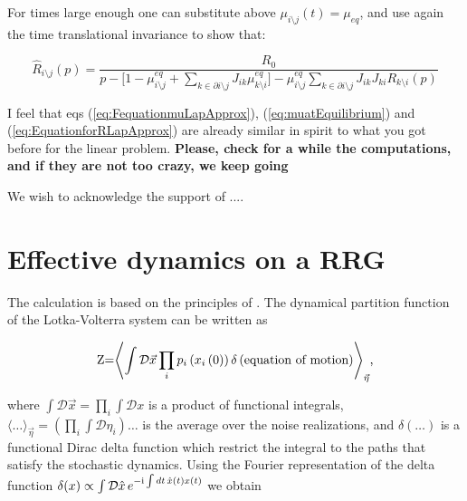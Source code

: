 \documentclass[
    preprint,
    linenumbers,
    amsmath,amssymb,amsfonts,
    aps, physrev,
    superscriptaddress,
    10pt,
    bibnotes
    ]{revtex4-2}
\begin{document}
For times large enough one can substitute above $\mu_{i \setminus j}(t)=\mu_{eq}$, and use again the time translational invariance to show that:

\begin{equation}
  \hat{R}_{i\setminus j}(p) = \frac{R_0}{ p -  \Big[1 - \mu^{eq}_{i \setminus j} + \sum_{k\in\partial i\setminus j}J_{ik}\mu^{eq}_{k\setminus i} \Big] -  \mu^{eq}_{i \setminus j}  \sum_{k\in\partial i\setminus j}
    J_{ik}J_{ki} R_{k\setminus i}(p)}
  \label{eq:EquationforRLapApprox}
\end{equation}


I feel that eqs (\ref{eq:FequationmuLapApprox}), (\ref{eq:muatEquilibrium}) and
(\ref{eq:EquationforRLapApprox}) are already similar in spirit to what you got before for the linear problem. {\bf Please, check for a while the computations, and if they are not too crazy, we keep going}
    


\begin{acknowledgments}
We wish to acknowledge the support of ....
\end{acknowledgments}



\appendix

\section{\label{sec:path_int_RRG}Effective dynamics on a RRG}

The calculation is based on the principles of \cite{taraboloGaussianApproximationDynamic2025}.
The dynamical partition function of the Lotka-Volterra system can
be written as

\begin{equation}
\text{Z=\ensuremath{\left\langle \int\mathcal{D}\vec{x}\prod_{i}p_{i}\left(x_{i}\left(0\right)\right)\delta\left(\text{equation of motion}\right)\right\rangle _{\vec{\eta}}},}
\end{equation}

where $\int\mathcal{D}\vec{x}=\prod_{i}\int\mathcal{D}x$ is a product
of functional integrals, $\langle\dots\rangle_{\vec{\eta}}=\left(\prod_{i}\int\mathcal{D}\eta_{i}\right)\dots$
is the average over the noise realizations, and $\delta(\dots)$ is
a functional Dirac delta function which restrict the integral to the
paths that satisfy the stochastic dynamics. Using the Fourier representation
of the delta function $\delta(x)\propto\int\mathcal{D}\hat{x}\,e^{-{\rm i}\int dt\,\hat{x}(t)x(t)}$
we obtain
\end{document}
